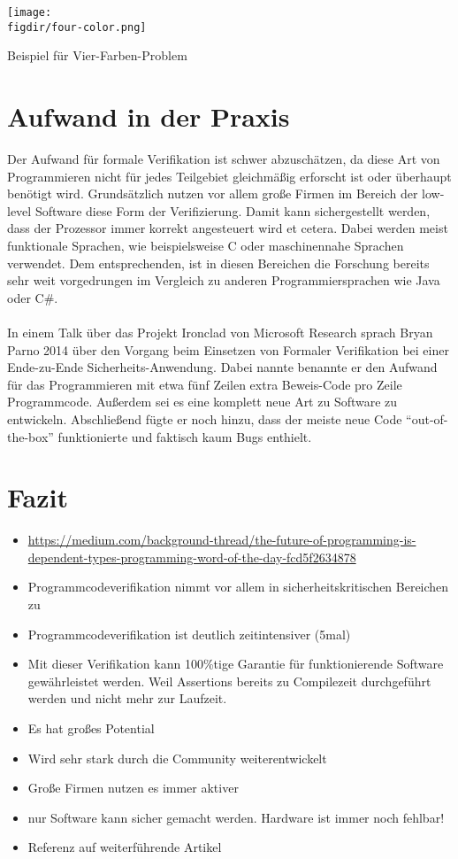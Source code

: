 \begin{minipage}{\textwidth}
	\centering
	\captionsetup{type=figure}
	\texttt{[image: \\figdir/four-color.png]}
	\caption{Beispiel für Vier-Farben-Problem}
	\label{fig:four-color}
\end{minipage}

\section{Aufwand in der Praxis}
Der Aufwand für formale Verifikation ist schwer abzuschätzen, da diese Art von Programmieren nicht für jedes Teilgebiet gleichmäßig erforscht ist oder überhaupt benötigt wird. Grundsätzlich nutzen vor allem große Firmen im Bereich der low-level Software diese Form der Verifizierung. Damit kann sichergestellt werden, dass der Prozessor immer korrekt angesteuert wird et cetera. Dabei werden meist funktionale Sprachen, wie beispielsweise C oder maschinennahe Sprachen verwendet. Dem entsprechenden, ist in diesen Bereichen die Forschung bereits sehr weit vorgedrungen im
Vergleich zu anderen Programmiersprachen wie Java oder C\#.\\
\\
In einem Talk über das Projekt Ironclad von Microsoft Research sprach Bryan Parno 2014 über den Vorgang beim Einsetzen von Formaler Verifikation bei einer Ende-zu-Ende Sicherheits-Anwendung. Dabei nannte benannte er den Aufwand für das Programmieren mit etwa fünf Zeilen extra Beweis-Code pro Zeile Programmcode. Außerdem sei es eine komplett neue Art zu Software zu entwickeln. Abschließend fügte er noch hinzu, dass der meiste neue Code "`out-of-the-box"' funktionierte und faktisch kaum Bugs enthielt.\cite{IRONCLAD01:FV}

\section{Fazit}
\begin{itemize}
	\item \url{https://medium.com/background-thread/the-future-of-programming-is-dependent-types-programming-word-of-the-day-fcd5f2634878}
	\item Programmcodeverifikation nimmt vor allem in sicherheitskritischen Bereichen zu
	\item Programmcodeverifikation ist deutlich zeitintensiver (5mal)
	\item Mit dieser Verifikation kann 100\%tige Garantie für funktionierende Software gewährleistet werden. Weil Assertions bereits zu Compilezeit durchgeführt werden und nicht mehr zur Laufzeit.
	\item Es hat großes Potential
	\item Wird sehr stark durch die Community weiterentwickelt
	\item Große Firmen nutzen es immer aktiver
	\item nur Software kann sicher gemacht werden. Hardware ist immer noch fehlbar!
	\item Referenz auf weiterführende Artikel
\end{itemize}

